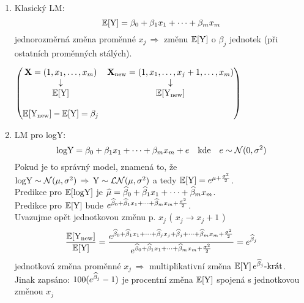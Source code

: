 \begin{enumerate}
\item Klasický LM: 
$$
 \mathbb{E} [ \text{Y} ] = \beta_0 + \beta_1 x_1 + \dots + \beta_m x_m
$$
jednorozměrná změna proměnné $ x_j \, \Rightarrow $ změnu $ \mathbb{E} [ \text{Y} ] $ o $ \beta_j $ jednotek (při ostatních proměnných stálých).

$ 
\left( \begin{matrix}
\textbf{X} = (1,x_1,\dots,x_m) & \textbf{X}_{\text{new}} = (1,x_1,\dots,x_j+1,\dots,x_m) \\
\downarrow &  \downarrow \\
\mathbb{E} [ \text{Y} ] & \mathbb{E} [ \text{Y}_{\text{new}} ] \\
 & \\
 \mathbb{E} [ \text{Y}_{\text{new}} ] - \mathbb{E} [ \text{Y} ]  = \beta_j &
\end{matrix} \right)
$
\item LM pro logY:
$$
 \text{logY} = \beta_0 + \beta_1 x_1 + \dots + \beta_m x_m + e \quad \text{kde} \quad e \sim \mathcal{N}(0,\sigma^2)
$$
Pokud je to správný model, znamená to, že $ \text{logY} \sim \mathcal{N}(\mu,\sigma^2) \, \Rightarrow \, \text{Y} \sim \mathcal{LN}(\mu,\sigma^2) $ a tedy $ \mathbb{E}[\text{Y}] = e^{\mu + \frac{\sigma^2}{2}} $. \\
Predikce pro $ \mathbb{E} [\text{logY}] $ je $ \widehat{\mu} = \widehat{\beta}_0 + \widehat{\beta}_1 x_1 + \dots + \widehat{\beta}_m x_m $. \\
Predikce pro $ \mathbb{E} [\text{Y}] $ bude $ e^{\widehat{\beta}_0 + \widehat{\beta}_1 x_1 + \dots + \widehat{\beta}_m x_m + \frac{\sigma^2}{2}} $. \\
Uvazujme opět jednotkovou změnu p. $ x_j $ ( $ x_j \rightarrow x_j + 1 $ )
$$
\dfrac{ \mathbb{E} [ \text{Y}_{\text{new}} ]}{\mathbb{E} [ \text{Y} ]} = \dfrac{e^{\widehat{\beta}_0 + \widehat{\beta}_1 x_1 + \dots + \widehat{\beta}_j x_j + \widehat{\beta}_j + \dots + \widehat{\beta}_m x_m + \frac{\sigma^2}{2}}}{e^{\widehat{\beta}_0 + \widehat{\beta}_1 x_1 + \dots + \widehat{\beta}_m x_m + \frac{\sigma^2}{2}}} = e^{\widehat{\beta}_j}
$$
jednotková změna proměnné $ x_j \, \Rightarrow  $ multiplikativní změna $ \mathbb{E} [ \text{Y} ] \, e^{\widehat{\beta}_j}\text{-krát} $.\\
Jinak zapsáno: $ 100(e^{\widehat{\beta}_j}-1) $ je procentní změna $ \mathbb{E} [ \text{Y} ]  $ spojená s jednotkovou změnou $ x_j $
\end{enumerate}